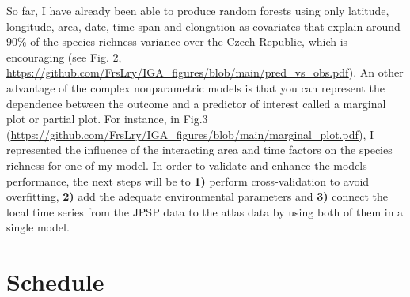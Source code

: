 \documentclass[
  12pt,
  oneside]{report}
\begin{document}
So far, I have already been able to produce random forests using only latitude, longitude, area, date, time span and elongation as covariates that explain around 90\% of the species richness variance over
the Czech Republic, which is encouraging (see Fig. 2,
\url{https://github.com/FrsLry/IGA_figures/blob/main/pred_vs_obs.pdf}). An other advantage of the complex
nonparametric models is that you can represent the dependence between the outcome and a
predictor of interest called a marginal plot or partial plot. For instance, in Fig.3
(\url{https://github.com/FrsLry/IGA_figures/blob/main/marginal_plot.pdf}), I represented the influence of the
interacting area and time factors on the species richness for one of my model. In order to validate and
enhance the models performance, the next steps will be to \textbf{1)} perform cross-validation to avoid
overfitting, \textbf{2)} add the adequate environmental parameters and \textbf{3)} connect the local time series from
the JPSP data to the atlas data by using both of them in a single model.

\hypertarget{schedule}{%
\chapter{Schedule}\label{schedule}}
\end{document}
